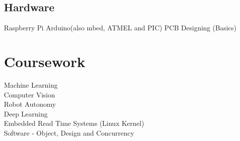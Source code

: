 \documentclass[]{resume-openfont}
\begin{document}
\begin{minipage}[t]{0.36\textwidth}
\subsection{Hardware}
Raspberry Pi \textbullet{} Arduino(also mbed, ATMEL and PIC)  \textbullet{} PCB Designing (Basics)


\section{Coursework}
Machine Learning \\
Computer Vision \\
Robot Autonomy \\
Deep Learning \\

Embedded Read Time Systems (Linux Kernel) \\
Software - Object, Design and Concurrency \\
\sectionsep


%
%

\end{minipage} 
\hfill
\end{document}
